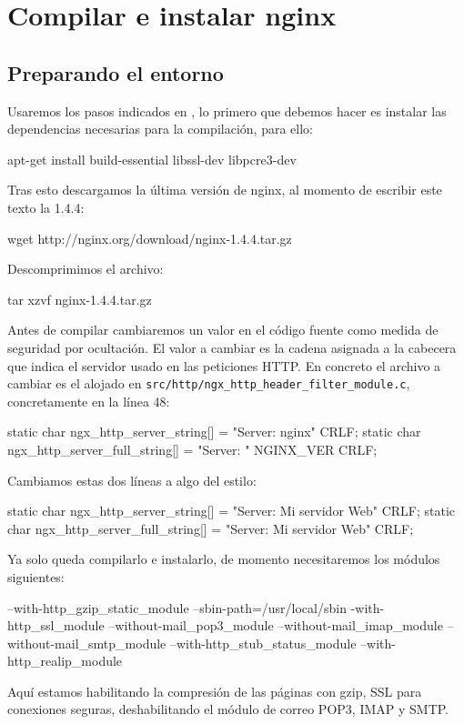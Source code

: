 \section{Compilar e instalar nginx}

\subsection{Preparando el entorno}
Usaremos los pasos indicados en \cite{nginx_baul}, lo primero que debemos
hacer es instalar las dependencias necesarias para la compilación, para ello:
\begin{bashcode}
apt-get install build-essential libssl-dev libpcre3-dev
\end{bashcode}
Tras esto descargamos la última versión de nginx, al momento de escribir
este texto la 1.4.4:
\begin{bashcode}
wget http://nginx.org/download/nginx-1.4.4.tar.gz
\end{bashcode}
Descomprimimos el archivo:
\begin{bashcode}
tar xzvf nginx-1.4.4.tar.gz
\end{bashcode}
Antes de compilar cambiaremos un valor en el código fuente como medida
de seguridad por ocultación. El valor a cambiar es la cadena asignada
a la cabecera que indica el servidor usado en las peticiones HTTP. En
concreto el archivo a cambiar es el alojado en \verb!src/http/ngx_http_header_filter_module.c!,
concretamente en la línea 48:
\begin{ccode}
static char ngx_http_server_string[] = "Server: nginx" CRLF;
static char ngx_http_server_full_string[] = "Server: " NGINX_VER CRLF;
\end{ccode}
Cambiamos estas dos líneas a algo del estilo:
\begin{ccode}
static char ngx_http_server_string[] = "Server: Mi servidor Web" CRLF;
static char ngx_http_server_full_string[] = "Server: Mi servidor Web" CRLF;
\end{ccode}
Ya solo queda compilarlo e instalarlo, de momento necesitaremos los módulos siguientes:
\begin{bashcode}
--with-http_gzip_static_module --sbin-path=/usr/local/sbin
-with-http_ssl_module --without-mail_pop3_module --without-mail_imap_module
--without-mail_smtp_module --with-http_stub_status_module --with-http_realip_module
\end{bashcode}
Aquí estamos habilitando la compresión de las páginas con gzip, SSL para conexiones
seguras, deshabilitando el módulo de correo POP3, IMAP  y SMTP.

